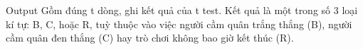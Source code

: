 Output
Gồm đúng t dòng, ghi kết quả của t test. Kết quả là một trong số 3 loại kí tự: B, C, hoặc R, tuỳ thuộc vào việc người cầm quân trắng thắng (B), người cầm quân đen thắng (C) hay trò chơi không bao giờ kết thúc (R).
